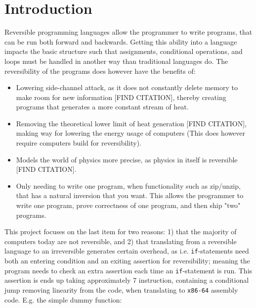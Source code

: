 
\section{Introduction \ms}
Reversible programming languages allow the programmer to write programs, that can be run
both forward and backwards. Getting this ability into a language impacts the basic structure
such that assignments, conditional operations, and loops must be handled in another way
than traditional languages do. The reversibility of the programs does however have the benefits
of:

\begin{itemize}
    \item Lowering side-channel attack, as it does not constantly delete memory to make room for
    new information [FIND CITATION], thereby creating programs that generates a more constant
    stream of heat.

    \item Removing the theoretical lower limit of heat generation [FIND CITATION], making way
    for lowering the energy usage of computers (This does however require computers build
    for reversibility).

    \item Models the world of physics more precise, as physics in itself is reversible
    [FIND CITATION].

    \item Only needing to write one program, when functionality such as zip/unzip, that has
    a natural inversion that you want. This allows the programmer to write one program, prove
    correctness of one program, and then ship "two" programs.
\end{itemize}
\noindent
This project focuses on the last item for two reasons: 1) that the majority of computers today are
not reversible, and 2) that translating from a reversible language to an irreversible
generates certain overhead, as i.e. \texttt{if}-statements need both an entering condition and an
exiting assertion for reversibility; meaning the program needs to check an extra assertion each
time an \texttt{if}-statement is run. This assertion is ends up taking approximately 7 instruction,
containing a conditional jump removing linearity from the code, when translating to
\texttt{x86-64} assembly code. E.g. the simple dummy function:

